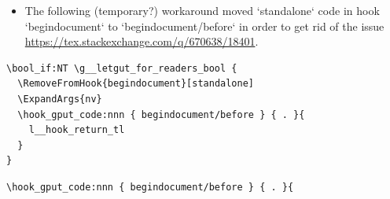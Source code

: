 \documentclass{letgut}
\begin{document}
\begin{itemize}
We currently have to work around an \lstinline+acro+ bug (see \url{https://tex.stackexchange.com/q/661966/18401}).

\begin{lstlisting}
\hook_gput_code:nnn { cmd/printacronyms/before } { . }{
  \bool_set_false:N\l__acro_link_only_first_bool
}
\end{lstlisting}

In case the long form of an acronym is explicited in footnote, we want this
footnot to be ended with a period.
\begin{lstlisting}
\ProvideDocumentCommand \acroendfootnote {} {.}
\end{lstlisting}

The following settings for packages that have to be the last ones loaded are
also done just before the begining of the document.

\item The following (temporary?) workaround moved `standalone` code in hook
`begindocument` to `begindocument/before` in order to get rid of the issue
\url{https://tex.stackexchange.com/q/670638/18401}.
\end{itemize}

\begin{lstlisting}
\bool_if:NT \g__letgut_for_readers_bool {
  \RemoveFromHook{begindocument}[standalone]
  \ExpandArgs{nv}
  \hook_gput_code:nnn { begindocument/before } { . }{
    l__hook_return_tl
  }
}
\end{lstlisting}

\begin{lstlisting}
\hook_gput_code:nnn { begindocument/before } { . }{
\end{lstlisting}
\end{document}
